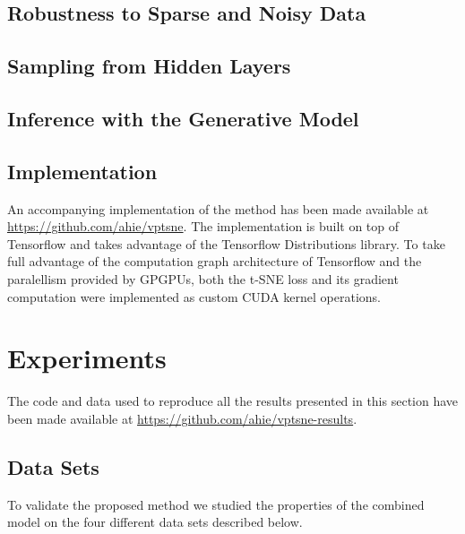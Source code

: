 \section{Robustness to Sparse and Noisy Data}
\label{section:robustness_to_sparse_and_noisy_data}
\newpage

\section{Sampling from Hidden Layers}
\label{section:sampling_from_hidden_layers}
\newpage

\section{Inference with the Generative Model}
\newpage

\section{Implementation}
\label{section:implementation}

An accompanying implementation of the method has been made available at \url{https://github.com/ahie/vptsne}. The implementation is built on top of Tensorflow \citep{tensorflow} and takes advantage of the Tensorflow Distributions \citep{tensorflow_distributions} library. To take full advantage of the computation graph architecture of Tensorflow and the paralellism provided by GPGPUs, both the t-SNE loss and its gradient computation were implemented as custom CUDA \citep{cuda} kernel operations.


\chapter{Experiments}
\label{ch:experiments}

The code and data used to reproduce all the results presented in this section have been made available at \url{https://github.com/ahie/vptsne-results}.

\section{Data Sets}
\label{subsection:data_sets}

To validate the proposed method we studied the properties of the combined model on the four different data sets described below.

